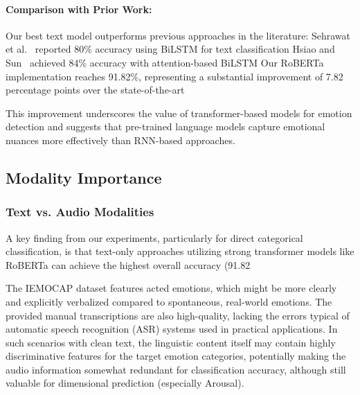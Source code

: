 \documentclass[12pt]{article}
\begin{document}
\paragraph{Comparison with Prior Work:}
Our best text model outperforms previous approaches in the literature:
    Sehrawat et al.~\cite{sehrawat2023deception} reported 80\% accuracy using BiLSTM for text classification
    Hsiao and Sun~\cite{hsiao2022attention} achieved 84\% accuracy with attention-based BiLSTM
    Our RoBERTa implementation reaches 91.82\%, representing a substantial improvement of 7.82 percentage points over the state-of-the-art

This improvement underscores the value of transformer-based models for emotion detection and suggests that pre-trained language models capture emotional nuances more effectively than RNN-based approaches.

\subsection{Modality Importance}
\subsubsection{Text vs. Audio Modalities}
A key finding from our experiments, particularly for direct categorical classification, is that text-only approaches utilizing strong transformer models like RoBERTa can achieve the highest overall accuracy (91.82%

The IEMOCAP dataset features acted emotions, which might be more clearly and explicitly verbalized compared to spontaneous, real-world emotions. The provided manual transcriptions are also high-quality, lacking the errors typical of automatic speech recognition (ASR) systems used in practical applications. In such scenarios with clean text, the linguistic content itself may contain highly discriminative features for the target emotion categories, potentially making the audio information somewhat redundant for classification accuracy, although still valuable for dimensional prediction (especially Arousal).
\end{document}
